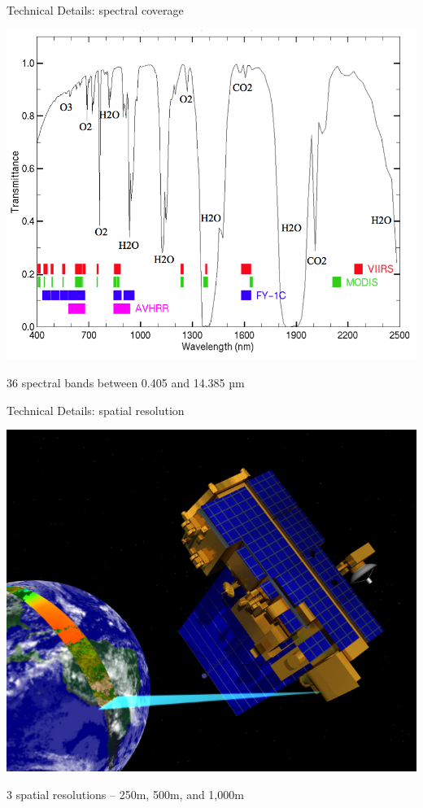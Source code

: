 \documentclass[ignorenonframetext,]{beamer}
\begin{document}
\begin{frame}{Technical Details: spectral coverage}

\includegraphics{assets/spectrum2.png}

36 spectral bands between 0.405 and 14.385 µm

\end{frame}

\begin{frame}{Technical Details: spatial resolution}

\includegraphics{assets/resolution.jpg}

3 spatial resolutions -- 250m, 500m, and 1,000m

\end{frame}
\end{document}
